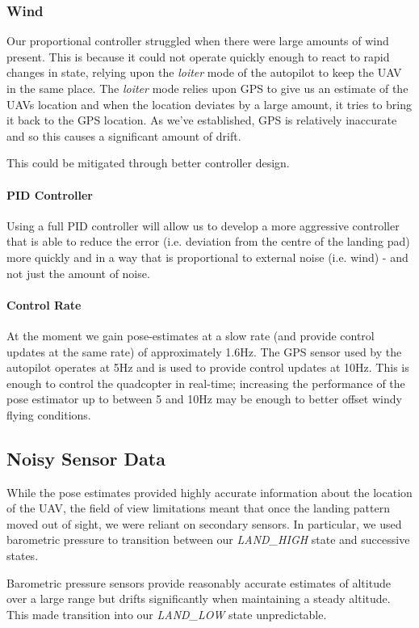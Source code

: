 \documentclass[10pt]{scrartcl} %
\begin{document}
\subsubsection{Wind}
Our proportional controller struggled when there were large amounts of wind
present. This is because it could not operate quickly enough to react to rapid
changes in state, relying upon the \textit{loiter} mode of the autopilot to
keep the UAV in the same place. The \textit{loiter} mode relies upon GPS to
give us an estimate of the UAVs location and when the location deviates by a
large amount, it tries to bring it back to the GPS location. As we've
established, GPS is relatively inaccurate and so this causes a significant
amount of drift.

This could be mitigated through better controller design.

\paragraph{PID Controller}
Using a full PID controller will allow us to develop a more aggressive
controller that is able to reduce the error (i.e. deviation from the centre of
the landing pad) more quickly and in a way that is proportional to external
noise (i.e. wind) - and not just the amount of noise.

\paragraph{Control Rate}
At the moment we gain pose-estimates at a slow rate (and provide control
updates at the same rate) of approximately 1.6Hz. The GPS sensor used by the
autopilot operates at 5Hz and is used to provide control updates at 10Hz. This
is enough to control the quadcopter in real-time; increasing the performance of
the pose estimator up to between 5 and 10Hz may be enough to better offset
windy flying conditions.

\subsection{Noisy Sensor Data}
While the pose estimates provided highly accurate information about the
location of the UAV, the field of view limitations meant that once the landing
pattern moved out of sight, we were reliant on secondary sensors. In
particular, we used barometric pressure to transition between our
\textit{LAND\_HIGH} state and successive states.

Barometric pressure sensors provide reasonably accurate estimates of altitude
over a large range but drifts significantly when maintaining a steady altitude.
This made transition into our \textit{LAND\_LOW} state unpredictable.
\end{document}

